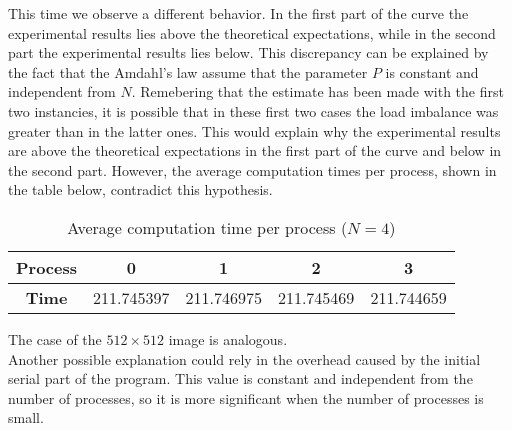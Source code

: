 \begin{figure}[H]
{
        }
    \end{figure}
    This time we observe a different behavior. In the first part of the
    curve the experimental results lies above the theoretical expectations,
    while in the second part the experimental results lies below. This
    discrepancy can be explained by the fact that the Amdahl's law assume
    that the parameter $P$ is constant and independent from $N$.
    Remebering that the estimate has been made with the first two instancies,
    it is possible that in these first two cases the load imbalance was
    greater than in the latter ones. This would explain why the experimental
    results are above the theoretical expectations in the first part of the
    curve and below in the second part. However, the average computation times
    per process, shown in the table below, contradict this hypothesis.
    \begin{table}[H]
        \centering
        \begin{tabular}{|c|c|c|c|c|}
        \hline
        \textbf{Process} & 0 & 1 & 2 & 3 \\ \hline
        \textbf{Time} & 211.745397 & 211.746975 & 211.745469 & 211.744659 \\ \hline
        \end{tabular}
        \caption{Average computation time per process ($N=4$)}
        \label{table:transposed_values}
    \end{table}
    The case of the $512 \times 512$ image is analogous. \\
    Another possible explanation could rely in the overhead caused by the 
    initial serial part of the program. This value is constant and
    independent from the number of processes, so it is more significant
    when the number of processes is small.

